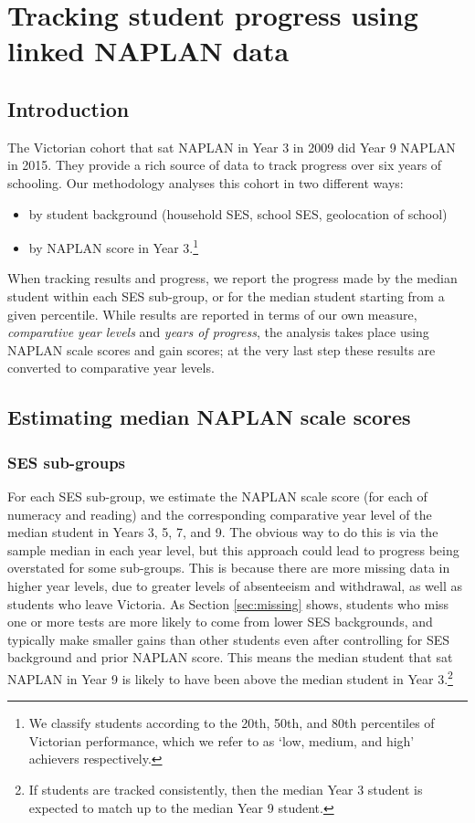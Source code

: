 \chapter{Tracking student progress using linked NAPLAN data} \label{chap4}

\section{Introduction}

The Victorian cohort that sat NAPLAN in Year 3 in 2009 did Year 9 NAPLAN in 2015. They provide a rich source of data to track progress over six years of schooling. Our methodology analyses this cohort in two different ways:
\begin{itemize}
\item by student background (household SES, school SES, geolocation of school)
\item by NAPLAN score in Year 3.\footnote{We classify students according to the 20th, 50th, and 80th percentiles of Victorian performance, which we refer to as `low, medium, and high' achievers respectively.}
\end{itemize}
When tracking results and progress, we report the progress made by the median student within each SES sub-group, or for the median student starting from a given percentile. While results are reported in terms of our own measure, \textit{comparative year levels} and \textit{years of progress}, the analysis takes place using NAPLAN scale scores and gain scores; at the very last step these results are converted to comparative year levels.

\section{Estimating median NAPLAN scale scores}

\subsection{SES sub-groups} \label{sec:ses_sub}

For each SES sub-group, we estimate the NAPLAN scale score (for each of numeracy and reading) and the corresponding comparative year level of the median student in Years 3, 5, 7, and 9. The obvious way to do this is via the sample median in each year level, but this approach could lead to progress being overstated for some sub-groups. This is because there are more missing data in higher year levels, due to greater levels of absenteeism and withdrawal, as well as students who leave Victoria. As Section \ref{sec:missing} shows, students who miss one or more tests are more likely to come from lower SES backgrounds, and typically make smaller gains than other students even after controlling for SES background and prior NAPLAN score. This means the median student that sat NAPLAN in Year 9 is likely to have been above the median student in Year 3.\footnote{If students are tracked consistently, then the median Year 3 student is expected to match up to the median Year 9 student.}

